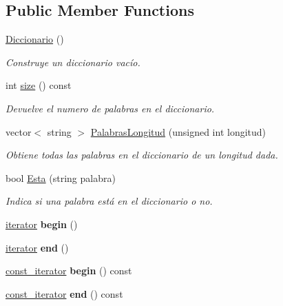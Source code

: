 \subsection*{Public Member Functions}
\begin{DoxyCompactItemize}
\item 
\hypertarget{classDiccionario_aa0a2191ec706b256c35b5229cc197b15}{\hyperlink{classDiccionario_aa0a2191ec706b256c35b5229cc197b15}{Diccionario} ()}\label{classDiccionario_aa0a2191ec706b256c35b5229cc197b15}

\begin{DoxyCompactList}\small\item\em Construye un diccionario vacío. \end{DoxyCompactList}\item 
\hypertarget{classDiccionario_abe2e0023732c4cef7f6960120e8cde39}{int \hyperlink{classDiccionario_abe2e0023732c4cef7f6960120e8cde39}{size} () const }\label{classDiccionario_abe2e0023732c4cef7f6960120e8cde39}

\begin{DoxyCompactList}\small\item\em Devuelve el numero de palabras en el diccionario. \end{DoxyCompactList}\item 
vector$<$ string $>$ \hyperlink{classDiccionario_a780bede8a63e0790af712a2ee17b3093}{Palabras\-Longitud} (unsigned int longitud)
\begin{DoxyCompactList}\small\item\em Obtiene todas las palabras en el diccionario de un longitud dada. \end{DoxyCompactList}\item 
bool \hyperlink{classDiccionario_a2091d415bc53c34a0e78e7bd9b073024}{Esta} (string palabra)
\begin{DoxyCompactList}\small\item\em Indica si una palabra está en el diccionario o no. \end{DoxyCompactList}\item 
\hypertarget{classDiccionario_ab270eb969d580f01b358e648a3061ac4}{\hyperlink{classDiccionario_1_1iterator}{iterator} {\bfseries begin} ()}\label{classDiccionario_ab270eb969d580f01b358e648a3061ac4}

\item 
\hypertarget{classDiccionario_a7de585de002dfdec241b645bc57a3d0a}{\hyperlink{classDiccionario_1_1iterator}{iterator} {\bfseries end} ()}\label{classDiccionario_a7de585de002dfdec241b645bc57a3d0a}

\item 
\hypertarget{classDiccionario_a843b15e8b44b94b5ce264e7d3ef3e715}{\hyperlink{classDiccionario_1_1const__iterator}{const\-\_\-iterator} {\bfseries begin} () const }\label{classDiccionario_a843b15e8b44b94b5ce264e7d3ef3e715}

\item 
\hypertarget{classDiccionario_ab7c8ad4596d23054165a0ab9af0dfc96}{\hyperlink{classDiccionario_1_1const__iterator}{const\-\_\-iterator} {\bfseries end} () const }\label{classDiccionario_ab7c8ad4596d23054165a0ab9af0dfc96}

\end{DoxyCompactItemize}

